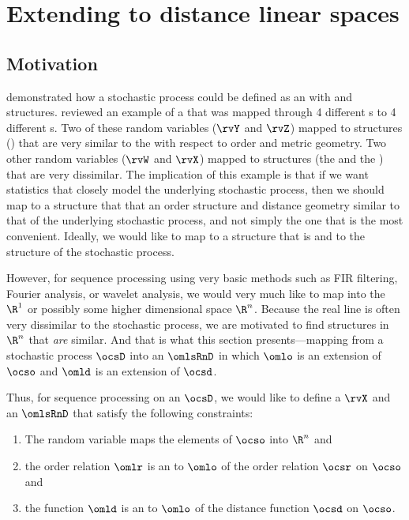 \section{Extending to distance linear spaces}
\subsection{Motivation}
 demonstrated how a stochastic process could be defined as an 
with  and  structures.
 reviewed an example of a  
that was mapped through 4 different s to 4 different s.
Two of these random variables ($\rvY$ and $\rvZ$) mapped to structures () that are very similar 
to the  with respect to order and metric geometry.
Two other random variables ($\rvW$ and $\rvX$) mapped to structures 
(the  and the ) that are very dissimilar.
The implication of this example is that if we want statistics that closely model the underlying stochastic process,
then we should map to a structure that that an order structure and distance geometry similar to 
that of the underlying stochastic process, and not simply the one that is the most convenient.
Ideally, we would like to map to a structure that is  
and   to the structure of the stochastic process.

However, for sequence processing using very basic methods such as FIR filtering, Fourier analysis,
or wavelet analysis,
we would very much like to map into the  $\R^1$ or possibly some higher dimensional space
$\R^n$.
Because the real line is often very dissimilar to the stochastic process,
we are motivated to find structures in $\R^n$ that \emph{are} similar.
And that is what this section presents---mapping from a stochastic process $\ocsD$ 
into an  $\omlsRnD$ in which $\omlo$ is an extension of $\ocso$ and
$\omld$ is an extension of $\ocsd$.

Thus, for sequence processing on an  $\ocsD$, we would like to 
define a  $\rvX$ and an  $\omlsRnD$ 
that satisfy the following constraints: 
\begin{enumerate}
  \item The random variable maps the elements of $\ocso$ into $\R^n$ and
  \item the order relation $\omlr$ is an  to $\omlo$ of the order relation $\ocsr$ on $\ocso$ and
  \item the  function $\omld$ is an  to $\omlo$ of the distance function $\ocsd$ on $\ocso$.
\end{enumerate}

